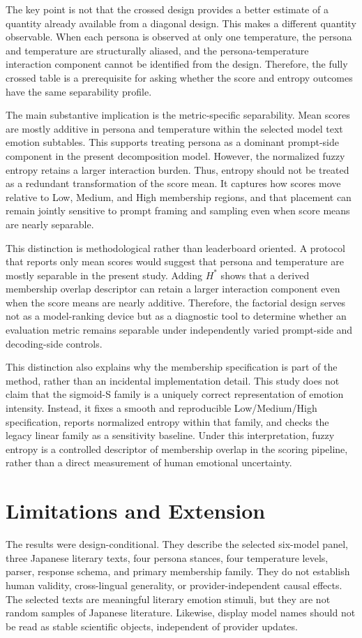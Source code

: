 \documentclass[conference]{IEEEtran}
\begin{document}
The key point is not that the crossed design provides a better estimate of a quantity already available from a diagonal design.
This makes a different quantity observable.
When each persona is observed at only one temperature, the persona and temperature are structurally aliased, and the persona-temperature interaction component cannot be identified from the design.
Therefore, the fully crossed table is a prerequisite for asking whether the score and entropy outcomes have the same separability profile.

The main substantive implication is the metric-specific separability.
Mean scores are mostly additive in persona and temperature within the selected model text emotion subtables.
This supports treating persona as a dominant prompt-side component in the present decomposition model.
However, the normalized fuzzy entropy retains a larger interaction burden.
Thus, entropy should not be treated as a redundant transformation of the score mean.
It captures how scores move relative to Low, Medium, and High membership regions, and that placement can remain jointly sensitive to prompt framing and sampling even when score means are nearly separable.

This distinction is methodological rather than leaderboard oriented.
A protocol that reports only mean scores would suggest that persona and temperature are mostly separable in the present study.
Adding $H^*$ shows that a derived membership overlap descriptor can retain a larger interaction component even when the score means are nearly additive.
Therefore, the factorial design serves not as a model-ranking device but as a diagnostic tool to determine whether an evaluation metric remains separable under independently varied prompt-side and decoding-side controls.

This distinction also explains why the membership specification is part of the method, rather than an incidental implementation detail.
This study does not claim that the sigmoid-S family is a uniquely correct representation of emotion intensity.
Instead, it fixes a smooth and reproducible Low/Medium/High specification, reports normalized entropy within that family, and checks the legacy linear family as a sensitivity baseline.
Under this interpretation, fuzzy entropy is a controlled descriptor of membership overlap in the scoring pipeline, rather than a direct measurement of human emotional uncertainty.

\section{Limitations and Extension}
The results were design-conditional.
They describe the selected six-model panel, three Japanese literary texts, four persona stances, four temperature levels, parser, response schema, and primary membership family.
They do not establish human validity, cross-lingual generality, or provider-independent causal effects.
The selected texts are meaningful literary emotion stimuli, but they are not random samples of Japanese literature.
Likewise, display model names should not be read as stable scientific objects, independent of provider updates.
\end{document}

